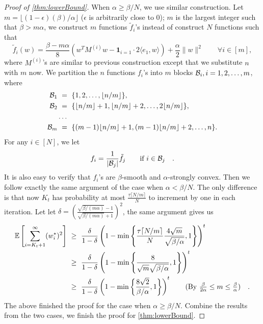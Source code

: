 \begin{proof}[Proof of \autoref{thm:lowerBound}]
    When $\alpha \geq \beta /N$, we use similar construction. Let $m = \lfloor (1-\epsilon)(\beta)/\alpha \rfloor$ ($\epsilon$ is arbitrarily close to 0); $m$ is the largest integer such that $\beta > m \alpha$, we construct $m$ functions $\tilde{f}_i$'s instead of construct $N$ functions such that
    \[
        \tilde{f}_i(w) = \frac{\beta - m \alpha}{8} \left( w^T M^{(i)} w - \mathbf{1}_{i=1} \cdot 2 \langle e_1, w \rangle \right) + \frac{\alpha}{2} \| w \|^2 \qquad \forall i \in [m],
    \]
    where $M^{(i)}$'s are similar to previous construction except that we substitute $n$ with $m$ now. We partition the $n$ functions $f_i$'s into $m$ blocks $\mathcal{B}_{i}, i=1,2,\ldots,m$, where
    \begin{align*}
        \mathcal{B}_1 &~=~ \{1,2,\ldots, \lfloor n/m \rfloor \}, \\
        \mathcal{B}_2 &~=~ \{ \lfloor n/m \rfloor+1,\lfloor n/m \rfloor+2,\ldots, 2\lfloor n/m \rfloor \}, \\
        & \dots \\
        \mathcal{B}_m &~=~ \{ (m-1)\lfloor n/m \rfloor+1, (m-1)\lfloor n/m \rfloor+2,\ldots, n \}.
    \end{align*} 
    For any $i \in [N]$, we let
    \[
        f_i = \frac{1}{|\mathcal{B}_j|} \tilde{f}_j  \quad \hbox{\quad if $i \in \mathcal{B}_j$\quad}.
    \]
    It is also easy to verify that $f_i$'s are $\beta$-smooth and $\alpha$-strongly convex. Then we follow exactly the same argument of the case when $\alpha < \beta /N$. The only difference is that now $K_t$ has probability at most $\frac{ \tau \lceil N/m \rceil }{N}$ to increment by one in each iteration. Let let $\delta = \left( \frac{\sqrt{ \beta/(m \alpha) } - 1}{ \sqrt{ \beta/(m \alpha) } + 1 } \right)^2 $, the same argument gives us
    \begin{align*}
        \mathbb{E} \left[ \sum_{i= K_t+1}^{\infty} ( w^*_i )^2 \right] &~\geq~ \frac{\delta}{1-\delta} \left( 1 - \min\left\{ \frac{\tau \lceil N/m \rceil }{N}  \frac{4 \sqrt{m} }{ \sqrt{ \beta/\alpha }  }, 1 \right\} \right)^t \\
        &~\geq~ \frac{\delta}{1-\delta} \left( 1 - \min\left\{   \frac{8 }{ \sqrt{m} \sqrt{ \beta/\alpha }  }, 1 \right\} \right)^t  \\
        &~\geq~ \frac{\delta}{1-\delta} \left( 1 - \min\left\{   \frac{8 \sqrt{2} }{   \beta/\alpha  }, 1 \right\} \right)^t  \quad \hbox{\quad(By $ \frac{\beta}{2\alpha} \leq  m \leq \frac{\beta}{\alpha}$)\quad}.
    \end{align*}
    The above finished the proof for the case when $\alpha \geq \beta /N$. Combine the results from the two cases, we finish the proof for \autoref{thm:lowerBound}.

\end{proof}
























